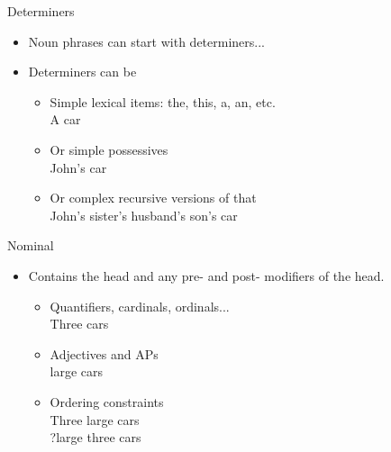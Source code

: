 \documentclass[9pt,xcolor=pdftex,dvipsnames,table]{beamer}
\begin{document}
\begin{frame}{Determiners}

\begin{itemize}
	\item Noun phrases can start with determiners...
	\item Determiners can be
	
	\begin{itemize}
		\item Simple lexical items: the, this, a, an, etc.\\
		A car 
		\item Or simple possessives\\
		John's car
		\item Or complex recursive versions of that\\
		John's sister's husband's son's car
	\end{itemize}
\end{itemize}
\end{frame}

\begin{frame}{Nominal}

\begin{itemize}
	\item Contains the head and any pre- and post- modifiers of the head.

	\begin{itemize}
		\item Quantifiers, cardinals, ordinals...\\
		Three cars
		\item Adjectives and APs\\
		large cars
		\item Ordering constraints\\
		Three large cars\\
		?large three cars
	\end{itemize}
\end{itemize}
\end{frame}
\end{document}
